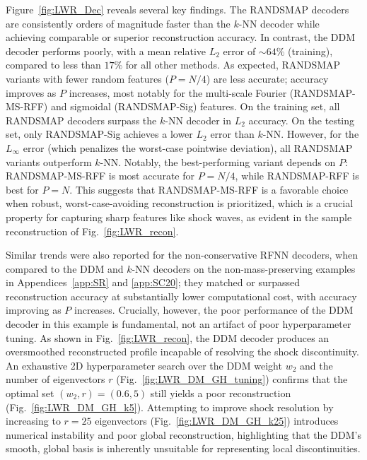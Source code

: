 \documentclass{article}
\begin{document}
Figure~\ref{fig:LWR_Dec} reveals several key findings. The RANDSMAP decoders are consistently orders of magnitude faster than the $k$-NN decoder while achieving comparable or superior reconstruction accuracy. In contrast, the DDM decoder performs poorly, with a mean relative $L_2$ error of $\sim 64\%$ (training), compared to less than $17\%$ for all other methods. As expected, RANDSMAP variants with fewer random features ($P=N/4$) are less accurate; accuracy improves as $P$ increases, most notably for the multi-scale Fourier (RANDSMAP-MS-RFF) and sigmoidal (RANDSMAP-Sig) features. On the training set, all RANDSMAP decoders surpass the $k$-NN decoder in $L_2$ accuracy. On the testing set, only RANDSMAP-Sig achieves a lower $L_2$ error than $k$-NN. However, for the $L_\infty$ error (which penalizes the worst-case pointwise deviation), all RANDSMAP variants outperform $k$-NN. Notably, the best-performing variant depends on $P$: RANDSMAP-MS-RFF is most accurate for $P=N/4$, while RANDSMAP-RFF is best for $P=N$. This suggests that RANDSMAP-MS-RFF is a favorable choice when robust, worst-case-avoiding reconstruction is prioritized, which is a crucial property for capturing sharp features like shock waves, as evident in the sample reconstruction of Fig.~\ref{fig:LWR_recon}.

Similar trends were also reported for the non-conservative RFNN decoders, when compared to the DDM and $k$-NN decoders on the non-mass-preserving examples in Appendices~\ref{app:SR} and \ref{app:SC20}; they matched or surpassed reconstruction accuracy at substantially lower computational cost, with accuracy improving as $P$ increases. Crucially, however, the poor performance of the DDM decoder in this example is fundamental, not an artifact of poor hyperparameter tuning. As shown in Fig.~\ref{fig:LWR_recon}, the DDM decoder produces an oversmoothed reconstructed profile incapable of resolving the shock discontinuity. An exhaustive 2D hyperparameter search over the DDM weight $w_2$ and the number of eigenvectors $r$ (Fig.~\ref{fig:LWR_DM_GH_tuning}) confirms that the optimal set $(w_2, r) = (0.6, 5)$ still yields a poor reconstruction (Fig.~\ref{fig:LWR_DM_GH_k5}). Attempting to improve shock resolution by increasing to $r=25$ eigenvectors (Fig.~\ref{fig:LWR_DM_GH_k25}) introduces numerical instability and poor global reconstruction, highlighting that the DDM’s smooth, global basis is inherently unsuitable for representing local discontinuities.
\end{document}
